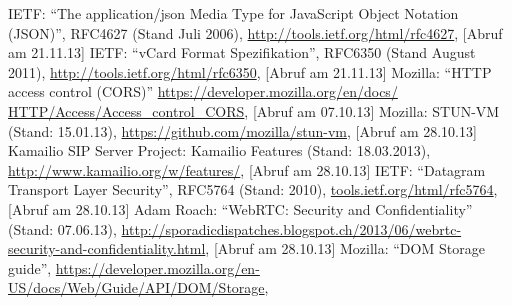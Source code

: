 













%


\begin{thebibliography}{literatur}
	 IETF: 
		"`The application/json Media Type for JavaScript Object Notation (JSON)"', RFC4627 (Stand Juli 2006),
		\hyperlink{http://tools.ietf.org/html/rfc4627}{http://tools.ietf.org/html/rfc4627}, 
		[Abruf am 21.11.13]
	 IETF: 
		"`vCard Format Spezifikation"', RFC6350 (Stand August 2011),
		\hyperlink{http://tools.ietf.org/html/rfc6350}{http://tools.ietf.org/html/rfc6350}, 
		[Abruf am 21.11.13]
	 Mozilla: 
		"`HTTP access control (CORS)"' 
		\hyperlink{https://developer.mozilla.org/en/docs/HTTP/Access_control_CORS}{https://developer.mozilla.org/en/docs/
		HTTP/Access/Access\_control\_CORS}, 
		[Abruf am 07.10.13]
	 Mozilla: 
		STUN-VM (Stand: 15.01.13), 
		\hyperlink{https://github.com/mozilla/stun-vm}{https://github.com/mozilla/stun-vm},
		[Abruf am 28.10.13]
	 Kamailio SIP Server Project: 
		Kamailio Features (Stand: 18.03.2013), 
		\hyperlink{http://www.kamailio.org/w/features/}{http://www.kamailio.org/w/features/}, 
		[Abruf am 28.10.13]
	 IETF: 
		"`Datagram Transport Layer Security"', RFC5764 (Stand: 2010), 
		\hyperlink{http://tools.ietf.org/html/rfc5764}{tools.ietf.org/html/rfc5764}, 
		[Abruf am 28.10.13]
	 Adam Roach: 
		"`WebRTC: Security and Confidentiality"' (Stand: 07.06.13), 
		\hyperlink{http://sporadicdispatches.blogspot.ch/2013/06/webrtc-security-and-confidentiality.html}{http://sporadicdispatches.blogspot.ch/2013/06/webrtc-security-and-confidentiality.html}, 
		[Abruf am 28.10.13]
	 Mozilla: 
		"`DOM Storage guide"',
		\hyperlink{https://developer.mozilla.org/en-US/docs/Web/Guide/API/DOM/Storage}{https://developer.mozilla.org/en-US/docs/Web/Guide/API/DOM/Storage},

\end{thebibliography}
